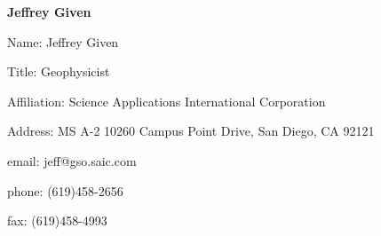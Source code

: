 \begin{center}
\LARGE
{\bf  Jeffrey Given}
\end{center}
\large
{}
\normalsize
\smallskip
\begin{description}
\item{Name:}  Jeffrey Given
\item{Title:}  Geophysicist
\item{Affiliation:}  Science Applications International Corporation
\item{Address:}  MS A-2 10260 Campus Point Drive, San Diego, CA  92121
\item{email:}  jeff@gso.saic.com
\item{phone:}  (619)458-2656
\item{fax:}  (619)458-4993
\end{description}

\medskip
\large
{}
\normalsize
\medskip

